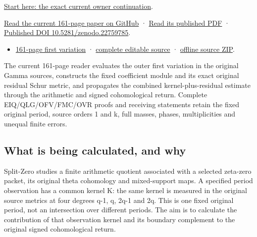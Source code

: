 \documentclass[
]{article}
\providecommand{\tightlist}{%
  \setlength{\itemsep}{0pt}\setlength{\parskip}{0pt}}
\begin{document}
\href{https://github.com/KokunoYumeto/zeta-function-research-reader/blob/af5c17948c24f43494ea76d823322e8b3924b58d/workbenches/splitzero-tandem/continuations/20260915-first-variation-continuation/00_CONTINUE_HERE.md}{Start
here: the exact current owner continuation}.

\href{https://github.com/KokunoYumeto/zeta-function-research-reader/blob/af5c17948c24f43494ea76d823322e8b3924b58d/workbenches/splitzero-tandem/continuations/20260915-first-variation-continuation/15_CURRENT_MIXED_CONTROL_READER.pdf}{Read
the current 161-page paper on GitHub} ·
\href{https://zenodo.org/api/records/22759785/files/61-first-variation-reader.pdf/content}{Read
its published PDF} ·
\href{https://doi.org/10.5281/zenodo.22759785}{Published DOI
10.5281/zenodo.22759785}.

\begin{itemize}
\tightlist
\item
  \href{https://zenodo.org/api/records/22759785/files/61-first-variation-reader.pdf/content}{161-page
  first variation} ·
  \href{https://github.com/KokunoYumeto/zeta-function-research-reader/tree/af5c17948c24f43494ea76d823322e8b3924b58d/workbenches/splitzero-tandem/continuations/20260915-first-variation-continuation}{complete
  editable source} ·
  \href{https://zenodo.org/api/records/22759785/files/62-first-variation-sources.zip/content}{offline
  source ZIP}.
\end{itemize}

The current 161-page reader evaluates the outer first variation in the
original Gamma sources, constructs the fixed coefficient module and its
exact original residual Schur metric, and propagates the combined
kernel-plus-residual estimate through the arithmetic and signed
cohomological return. Complete EIQ/QLG/OFV/FMC/OVR proofs and receiving
statements retain the fixed original period, source orders 1 and k, full
masses, phases, multiplicities and unequal finite errors.

\subsection{What is being calculated, and
why}\label{what-is-being-calculated-and-why-1}

Split-Zero studies a finite arithmetic quotient associated with a
selected zeta-zero packet, its original theta cohomology and
mixed-support maps. A specified period observation has a common kernel
K: the same kernel is measured in the original source metrics at four
degrees q-1, q, 2q-1 and 2q. This is one fixed original period, not an
intersection over different periods. The aim is to calculate the
contribution of that observation kernel and its boundary complement to
the original signed cohomological return.
\end{document}
